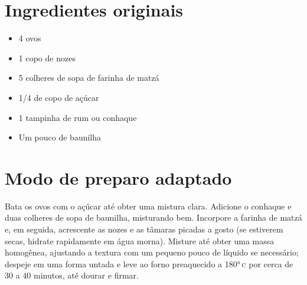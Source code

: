 \section{Ingredientes originais}

\begin{itemize}
\item 4 ovos
\item 1 copo de nozes
\item 5 colheres de sopa de farinha de matzá
\item 1/4 de copo de açúcar
\item 1 tampinha de rum ou conhaque
\item Um pouco de baunilha
\end{itemize}

\section{Modo de preparo adaptado}

Bata os ovos com o açúcar até obter uma mistura clara. Adicione o conhaque e duas colheres de sopa de baunilha, misturando bem. Incorpore a farinha de matzá e, em seguida, acrescente as nozes e as tâmaras picadas a gosto (se estiverem secas, hidrate rapidamente em água morna). Misture até obter uma massa homogênea, ajustando a textura com um pequeno pouco de líquido se necessário; despeje em uma forma untada e leve ao forno preaquecido a 180°\,\textsc{c} por cerca de 30 a 40 minutos, até dourar e firmar.